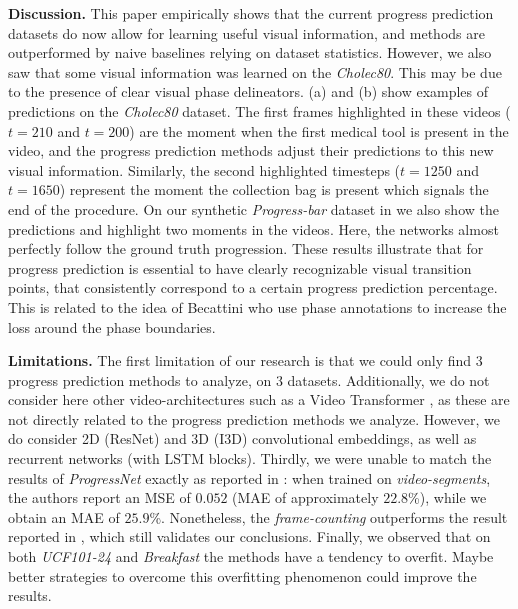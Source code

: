 \noindent\textbf{Discussion.} 
This paper empirically shows that the current progress prediction datasets do now allow for learning useful visual information, and methods are outperformed by naive baselines relying on dataset statistics. 
However, we also saw that some visual information was learned on the \textsl{Cholec80}.
This may be due to the presence of clear visual phase delineators. 
(a) and (b) show examples of predictions on the \textsl{Cholec80} dataset. 
The first frames highlighted in these videos ($t{=}210$ and $t{=}200$) are the moment when the first medical tool is present in the video, and the progress prediction methods adjust their predictions to this new visual information. 
Similarly, the second highlighted timesteps ($t{=}1250$ and $t{=}1650$) represent the moment the collection bag is present which signals the end of the procedure. 
On our synthetic \textsl{Progress-bar} dataset in  we also show the predictions and highlight two moments in the videos. 
Here, the networks almost perfectly follow the ground truth progression. 
These results illustrate that for progress prediction is essential to have clearly recognizable visual transition points, that consistently correspond to a certain progress prediction percentage. 
This is related to the idea of Becattini \etal \cite{becattini2017} who use phase annotations to increase the loss around the phase boundaries.

\smallskip\noindent\textbf{Limitations.} 
The first limitation of our research is that we could only find 3 progress prediction methods to analyze, on 3 datasets. 
Additionally, we do not consider here other video-architectures such as a Video Transformer \cite{arnab2021}, as these are not directly related to the progress prediction methods we analyze.
However, we do consider 2D (ResNet) and 3D (I3D) convolutional embeddings, as well as recurrent networks (with LSTM blocks). 
Thirdly, we were unable to match the results of \textsl{ProgressNet} exactly as reported in \cite{becattini2017}: 
when trained on \textsl{video-segments}, the authors report an MSE of $0.052$ (MAE of approximately $22.8$\%), while we obtain an MAE of $25.9$\%.
Nonetheless, the \textsl{frame-counting} outperforms the result reported in \cite{becattini2017}, which still validates our conclusions.
Finally, we observed that on both \textsl{UCF101-24} and \textsl{Breakfast} the methods have a tendency to overfit. 
Maybe better strategies to overcome this overfitting phenomenon could improve the results.

